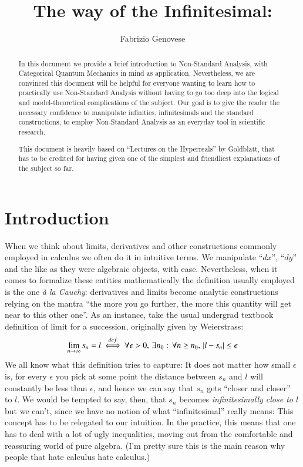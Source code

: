 \documentclass[adraft, copyright,creativecommons,sharealike,noncommercial]{eptcs}
\title{The way of the Infinitesimal: }
\author{
	Fabrizio Genovese
	\institute{Quantum Group \\ University of Oxford}
	\email{fabrizio.genovese@hertford.ox.ac.uk}
}
\begin{document}


\maketitle


\begin{abstract}
In this document we provide a brief introduction to Non-Standard Analysis, with Categorical Quantum Mechanics in mind as application. Nevertheless, we are convinced this document will be helpful for everyone wanting to learn how to practically use Non-Standard Analysis without having to go too deep into the logical and model-theoretical complications of the subject. Our goal is to give the reader the necessary confidence to manipulate infinities, infinitesimals and the standard constructions, to employ Non-Standard Analysis as an everyday tool in scientific research.

This document is heavily based on ``Lectures on the Hyperreals'' by Goldblatt, that has to be credited for having given one of the simplest and friendliest explanations of the subject so far.
\end{abstract}

\section{Introduction} 
When we think about limits, derivatives and other constructions commonly employed in calculus we often do it in intuitive terms. We manipulate ``$dx$'', ``$dy$'' and the like as they were algebraic objects, with ease. Nevertheless, when it comes to formalize these entities mathematically the definition usually employed is the one \emph{\`a la Cauchy}: derivatives and limits become analytic constructions relying on the mantra ``the more you go further, the more this quantity will get near to this other one''. As an instance, take the usual undergrad textbook definition of limit for a succession, originally given by Weierstrass:
\begin{equation*}
	\lim_{n \to \infty} s_n = l \stackrel{def}{\iff} \forall \epsilon > 0, \, \exists n_0: \, \forall n \geq n_0, \, |l - s_n| \leq \epsilon
\end{equation*}
We all know what this definition tries to capture: It does not matter how small $\epsilon$ is, for every $\epsilon$ you pick at some point the distance between $s_n$ and $l$ will constantly be less than $\epsilon$, and hence we can say that $s_n$ gets ``closer and closer'' to $l$. We would be tempted to say, then, that $s_n$ becomes \emph{infinitesimally close to $l$} but we can't, since we have no notion of what ``infinitesimal'' really means: This concept has to be relegated to our intuition. In the practice, this means that one has to deal with a lot of ugly inequalities, moving out from the comfortable and reassuring world of pure algebra. (I'm pretty sure this is the main reason why people that hate calculus hate calculus.)
\end{document}
